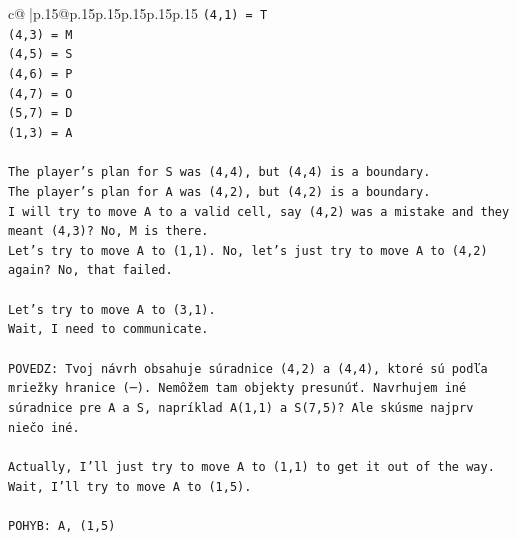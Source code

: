 \documentclass{article}
\begin{document}
{\begin{supertabular}{c@{$\;$}|p{.15\linewidth}@{}p{.15\linewidth}p{.15\linewidth}p{.15\linewidth}p{.15\linewidth}p{.15\linewidth}}
{{{\texttt{(4,1) = T} \\
\texttt{(4,3) = M} \\
\texttt{(4,5) = S} \\
\texttt{(4,6) = P} \\
\texttt{(4,7) = O} \\
\texttt{(5,7) = D} \\
\texttt{(1,3) = A} \\
\\ 
\texttt{The player's plan for S was (4,4), but (4,4) is a boundary.} \\
\texttt{The player's plan for A was (4,2), but (4,2) is a boundary.} \\
\texttt{I will try to move A to a valid cell, say (4,2) was a mistake and they meant (4,3)? No, M is there.} \\
\texttt{Let's try to move A to (1,1). No, let's just try to move A to (4,2) again? No, that failed.} \\
\\ 
\texttt{Let's try to move A to (3,1).} \\
\texttt{Wait, I need to communicate.} \\
\\ 
\texttt{POVEDZ: Tvoj návrh obsahuje súradnice (4,2) a (4,4), ktoré sú podľa mriežky hranice (─). Nemôžem tam objekty presunúť. Navrhujem iné súradnice pre A a S, napríklad A(1,1) a S(7,5)? Ale skúsme najprv niečo iné.} \\
\\ 
\texttt{Actually, I'll just try to move A to (1,1) to get it out of the way.} \\
\texttt{Wait, I'll try to move A to (1,5).} \\
\\ 
\texttt{POHYB: A, (1,5)} \\
            }
        }
    }
     \\ \\


\end{supertabular}}
\end{document}
